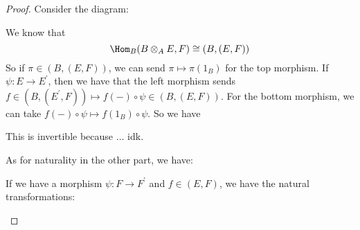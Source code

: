 \documentclass{article}
\begin{document}
        \begin{proof}
            Consider the diagram:
                \begin{center}
                \end{center}
            We know that 
                \begin{equation*}
                    \Hom_{B}(B \otimes_{A} E, F) \cong (B, (E, F))
                \end{equation*}
            So if $\pi \in (B, (E, F))$, we can send $\pi \mapsto \pi (1_{B})$ for the top morphism. If $\psi : E \rightarrow E^{\prime}$, then we have that the left morphism sends $f \in (B, (E^{\prime}, F)) \mapsto  f(-) \circ \psi \in (B, (E, F))$. For the bottom morphism, we can take $f(-) \circ \psi \mapsto f(1_{B}) \circ \psi$. So we have
                \begin{center}
                \end{center}
            This is invertible because $\ldots$ idk.

            As for naturality in the other part, we have:
                \begin{center}
                \end{center}
            If we have a morphism $ \psi : F \rightarrow F^{\prime}$ and $f \in (E, F)$, we have the natural transformations:
                \begin{center}
                \end{center}
        \end{proof}
\end{document}
